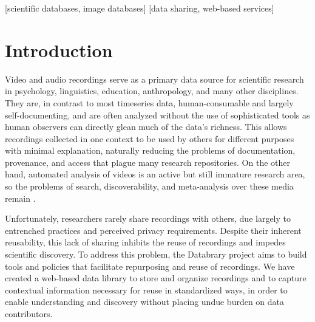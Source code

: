 \documentclass{sig-alternate}
\begin{document}
[scientific databases, image databases]
[data sharing, web-based services]



\section{Introduction}

Video and audio recordings serve as a primary data source for scientific research in psychology, linguistics, education, anthropology, and many other disciplines.
They are, in contrast to most timeseries data, human-consumable and largely self-documenting, and are often analyzed without the use of sophisticated tools as human observers can directly glean much of the data's richness.
This allows recordings collected in one context to be used by others for different purposes with minimal explanation, naturally reducing the problems of documentation, provenance, and access that plague many research repositories.
On the other hand, automated analysis of videos is an active but still immature research area, so the problems of search, discoverability, and meta-analysis over these media remain \cite{Albertson_2013, Lanagan_Smeaton_2012}.

Unfortunately, researchers rarely share recordings with others, due largely to entrenched practices and perceived privacy requirements.
Despite their inherent reusability, this lack of sharing inhibits the reuse of recordings and impedes scientific discovery.
To address this problem, the Databrary project aims to build tools and policies that facilitate repurposing and reuse of recordings.
We have created a web-based data library to store and organize recordings and to capture contextual information necessary for reuse in standardized ways, in order to enable understanding and discovery without placing undue burden on data contributors.
\end{document}

